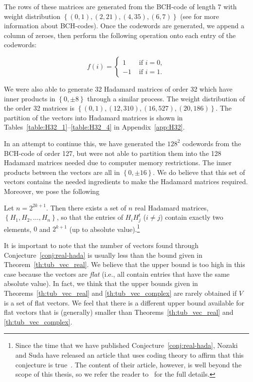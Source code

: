 The rows of these matrices are generated from the BCH-code \cite{BCH-BC,BCH-H} of length 7 with weight distribution $\left\{(0,1),(2,21),(4,
35),(6,7)\right\}$ (see \cite{Lint} for more information about BCH-codes). Once the codewords are generated, we append a column of zeroes, then perform the following operation onto each entry of the codewords:

\begin{equation}\label{eq:hada-to-bin}
f(i) = \begin{cases}
          1 & \text{ if } i = 0, \\
         -1 & \text{ if } i = 1.
         \end{cases}
\end{equation}

We were also able to generate 32 Hadamard matrices of order 32 which have inner products in $\left\{0,\pm8 \right\}$ through a similar process. The weight distribution of the order 32 matrices is $\left\{(0,1), (12, 310), (16, 527), (20, 186)\right\}$. The partition of the vectors into Hadamard matrices is shown in Tables~\ref{table:H32_1}--\ref{table:H32_4} in Appendix~\ref{app:H32}.

In an attempt to continue this, we have generated the $128^2$ codewords from the BCH-code of order 127, but were not able to partition them into the 128 Hadamard matrices needed due to computer memory restrictions. The inner products between the vectors are all in $\left\{0,\pm16\right\}$. We do believe that this set of vectors contains the needed ingredients to make the Hadamard matrices required. Moreover, we pose the following

\begin{conjecture}\label{conj:real-hada}
 Let $n = 2^{2k+1}$. Then there exists a set of $n$ real Hadamard matrices, $\left\{H_1, H_2, \dots , H_n\right\}$, so that the entries of $H_iH_j^t$ ($i \neq j$) contain exactly two elements, $0$ and $2^{k+1}$ (up to absolute value).\footnote{Since the time that we have published Conjecture~\ref{conj:real-hada}, Nozaki and Suda have released an article that uses coding theory to affirm that this conjecture is true~\cite[Page 15]{nozaki-suda}. The content of their article, however, is well beyond the scope of this thesis, so we refer the reader to~\cite{nozaki-suda} for the full details.}
\end{conjecture}

It is important to note that the number of vectors found through Conjecture~\ref{conj:real-hada} is usually less than the bound given in Theorem~\ref{th:tub_vec_real}. We believe that the upper bound is too high in this case because the vectors are {\it flat} (i.e., all contain entries that have the same absolute value). In fact, we think that the upper bounds given in Theorems~\ref{th:tub_vec_real} and \ref{th:tub_vec_complex} are rarely obtained if $V$ is a set of flat vectors.  We feel that there is a different upper bound available for flat vectors that is (generally) smaller than Theorems~\ref{th:tub_vec_real} and \ref{th:tub_vec_complex}.

